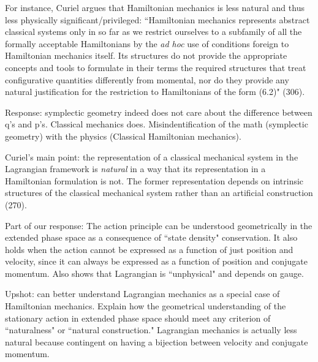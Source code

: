 \documentclass[letterpaper]{article}
\begin{document}
For instance, Curiel argues that Hamiltonian mechanics is less natural and thus less physically significant/privileged:  ``Hamiltonian mechanics represents abstract classical systems only in so far as we restrict ourselves to a subfamily of all the formally acceptable Hamiltonians by the \textit{ad hoc} use of conditions foreign to Hamiltonian mechanics itself. Its structures do not provide the appropriate concepts and tools to formulate in their terms the required structures that treat configurative quantities differently from momental, nor do they provide any natural justification for the restriction to Hamiltonians of the form (6.2)" (306). 

Response: symplectic geometry indeed does not care about the difference between q's and p's. Classical mechanics does. Misindentification of the math (symplectic geometry) with the physics (Classical Hamiltonian mechanics).

Curiel's main point: the representation of a classical mechanical system in the Lagrangian framework is \textit{natural} in a way that its representation in a Hamiltonian formulation is not. The former representation depends on intrinsic structures of the classical mechanical system rather than an artificial construction (270).

Part of our response: The action principle can be understood geometrically in the extended phase space as a consequence of ``state density" conservation. It also holds when the action cannot be expressed as a function of just position and velocity, since it can always be expressed as a function of position and conjugate momentum. Also shows that Lagrangian is ``unphysical" and depends on gauge.


Upshot: can better understand Lagrangian mechanics as a special case of Hamiltonian mechanics. Explain how the geometrical understanding of the stationary action in extended phase space should meet any criterion of ``naturalness" or ``natural construction." Lagrangian mechanics is actually less natural because contingent on having a bijection between velocity and conjugate momentum.

%


\end{document}
